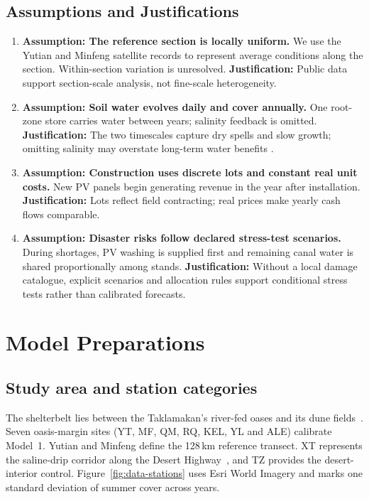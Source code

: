 \documentclass{mcmthesis}
\begin{document}
\subsection{Assumptions and Justifications}
\begingroup
\setlength{\topsep}{0pt}
\setlength{\partopsep}{0pt}
\setlength{\parsep}{0pt}
\setlength{\itemsep}{4pt}
\begin{enumerate}
  \item \textbf{Assumption: The reference section is locally uniform.} We use the Yutian and Minfeng satellite records to represent average conditions along the section. Within-section variation is unresolved.
  \newline \textbf{Justification:} Public data support section-scale analysis, not fine-scale heterogeneity.

  \item \textbf{Assumption: Soil water evolves daily and cover annually.} One root-zone store carries water between years; salinity feedback is omitted.
  \newline \textbf{Justification:} The two timescales capture dry spells and slow growth; omitting salinity may overstate long-term water benefits \cite{REF01,REF04}.

  \item \textbf{Assumption: Construction uses discrete lots and constant real unit costs.} New PV panels begin generating revenue in the year after installation.
  \newline \textbf{Justification:} Lots reflect field contracting; real prices make yearly cash flows comparable.

  \item \textbf{Assumption: Disaster risks follow declared stress-test scenarios.} During shortages, PV washing is supplied first and remaining canal water is shared proportionally among stands.
  \newline \textbf{Justification:} Without a local damage catalogue, explicit scenarios and allocation rules support conditional stress tests rather than calibrated forecasts.
\end{enumerate}
\endgroup

\section{Model Preparations}\label{sec:data}
\subsection{Study area and station categories}
The shelterbelt lies between the Taklamakan's river-fed oases and its dune fields~\cite{REF06}. Seven oasis-margin sites (YT, MF, QM, RQ, KEL, YL and ALE) calibrate Model~1. Yutian and Minfeng define the 128\,km reference transect. XT represents the saline-drip corridor along the Desert Highway~\cite{REF01}, and TZ provides the desert-interior control. Figure~\ref{fig:data-stations} uses Esri World Imagery and marks one standard deviation of summer cover across years.
\end{document}

